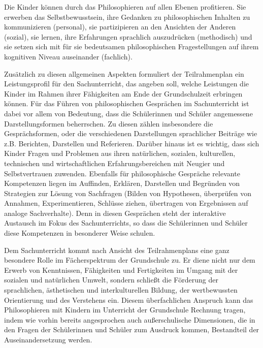 Die Kinder können durch das Philosophieren auf allen Ebenen profitieren. 
Sie erwerben das Selbstbewusstsein, ihre Gedanken zu philosophischen Inhalten zu kommunizieren (personal), sie partizipieren an den Ansichten der Anderen (sozial), sie lernen, ihre Erfahrungen sprachlich auszudrücken (methodisch) und sie setzen sich mit für sie bedeutsamen philosophischen Fragestellungen auf ihrem kognitiven Niveau auseinander (fachlich).

Zusätzlich zu diesen allgemeinen Aspekten formuliert der Teilrahmenplan ein Leistungsprofil für den Sachunterricht, das angeben soll, welche Leistungen die Kinder im Rahmen ihrer Fähigkeiten am Ende der Grundschulzeit erbringen können. 
Für das Führen von philosophischen Gesprächen im Sachunterricht ist dabei vor allem von Bedeutung, dass die Schülerinnen und Schüler \glqq angemessene Darstellungsformen\grqq{}\cite{MDFJ06, S.8} beherrschen.
Zu diesen zählen insbesondere die Gesprächsformen, oder die verschiedenen Darstellungen sprachlicher Beiträge wie z.B. Berichten, Darstellen und Referieren.
Darüber hinaus ist es wichtig, dass sich Kinder \glqq Fragen und Problemen aus ihren natürlichen, sozialen, kulturellen, technischen und wirtschaftlichen Erfahrungsbereichen mit Neugier und Selbstvertrauen\grqq{}\cite{MDFJ06, S.8} zuwenden. 
Ebenfalls für philosophische Gespräche relevante Kompetenzen liegen im \glqq Auffinden, Erklären, Darstellen und Begründen von Strategien zur Lösung von Sachfragen (Bilden von Hypothesen, überprüfen von Annahmen, Experimentieren, Schlüsse ziehen, übertragen von Ergebnissen auf analoge Sachverhalte).\grqq{}\cite{MDFJ06, S.8}
Denn in diesen Gesprächen steht der interaktive Austausch im Fokus des Sachunterrichts, so dass die Schülerinnen und Schüler diese Kompetenzen in besonderer Weise schulen.

Dem Sachunterricht kommt nach Ansicht des Teilrahmenplans eine ganz besondere Rolle im Fächerspektrum der Grundschule zu. 
Er diene \glqq nicht nur dem Erwerb von Kenntnissen, Fähigkeiten und Fertigkeiten im Umgang mit der sozialen und natürlichen Umwelt, sondern schließt die Förderung der sprachlichen, ästhetischen und interkulturellen Bildung, der wertbewussten Orientierung und des Verstehens ein.\grqq{}\cite{MDFJ06, S.9} 
Diesem überfachlichen Anspruch kann das Philosophieren mit Kindern im Unterricht der Grundschule Rechnung tragen, indem wie vorhin bereits angesprochen auch außerschulische Dimensionen, die in den Fragen der Schülerinnen und Schüler zum Ausdruck kommen, Bestandteil der Auseinandersetzung werden.

